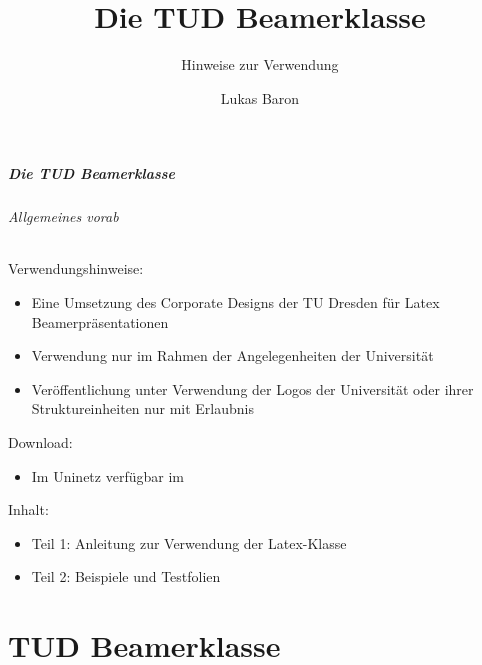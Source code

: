 \documentclass[german,notoc,draft]{tudbeamer}%
\title[TUD Beamer]{Die TUD Beamerklasse}
\subtitle{Hinweise zur Verwendung}
\author{Lukas Baron}
\institute[ET-IT \textbullet{} IfA]{Fakultät Elektrotechnik und Informationstechnik \textbullet{} Institut für Automatisierungstechnik}
\begin{document}
% 
% 
 
\maketitle

% 
%
\disableFrameTitleSectionNum
\begin{frame}
	\frametitle{Die TUD Beamerklasse}
	\framesubtitle{Allgemeines vorab}

	Verwendungshinweise:
	\begin{itemize}
		\item Eine Umsetzung des Corporate Designs der TU Dresden für Latex Beamerpräsentationen
		\item Verwendung nur im Rahmen der Angelegenheiten der Universität
		\item Veröffentlichung unter Verwendung der Logos der Universität oder ihrer Struktureinheiten nur mit Erlaubnis
	\end{itemize}
	Download:
	\begin{itemize}
		\item Im Uninetz verfügbar im \href{%
				https://git.agtele.eats.et.tu-dresden.de/agtele-public/latex/de.tud.et.ifa.latex.ifaslides%
			}{%
			}
	\end{itemize}
	Inhalt:
	\begin{itemize}
		\item Teil 1: Anleitung zur Verwendung der Latex-Klasse 
		\item Teil 2: Beispiele und Testfolien
	\end{itemize}
\end{frame}
\enableFrameTitleSectionNum


\part{TUD Beamerklasse}
\end{document}
